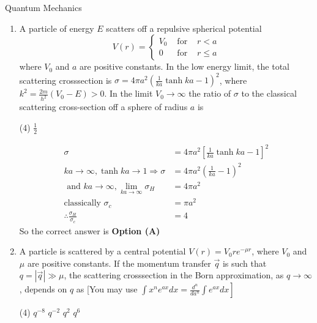 \begin{abox}
	Quantum Mechanics
	\end{abox}
\begin{enumerate}
	\item A particle of energy $E$ scatters off a repulsive spherical potential
	$$
	V(r)=\left\{\begin{array}{ccc}
	V_{0} & \text { for } & r<a \\
	0 & \text { for } & r \leq a
	\end{array}\right.
	$$
	where $V_{0}$ and $a$ are positive constants. In the low energy limit, the total scattering crosssection is $\sigma=4 \pi a^{2}\left(\frac{1}{k a} \tanh k a-1\right)^{2}$, where $k^{2}=\frac{2 m}{h^{2}}\left(V_{0}-E\right)>0$. In the limit $V_{0} \rightarrow \infty$ the ratio of $\sigma$ to the classical scattering cross-section off a sphere of radius $a$ is
{	}
\begin{tasks}(4)
\task[\textbf{D.}] $\frac{1}{2}$
\end{tasks}
\begin{answer}
\begin{align*}
\sigma&=4 \pi a^{2}\left[\frac{1}{k a} \tanh k a-1\right]^{2}\\
k a \rightarrow \infty, \tanh k a \rightarrow 1 \Rightarrow \sigma&=4 \pi a^{2}\left(\frac{1}{k a}-1\right)^{2}\\
\text{	and }k a \rightarrow \infty, \lim _{k a \rightarrow \infty} \sigma_{H}&=4 \pi a^{2}\\
\text{classically }\sigma_{c}&=\pi a^{2}\\
\therefore \frac{\sigma_{H}}{\sigma_{c}}&=4
\end{align*}
So the correct answer is \textbf{Option (A)}
\end{answer}
\item 	A particle is scattered by a central potential $V(r)=V_{0} r e^{-\mu r}$, where $V_{0}$ and $\mu$ are positive constants. If the momentum transfer $\vec{q}$ is such that $q=|\vec{q}| \gg \mu$, the scattering crosssection in the Born approximation, as $q \rightarrow \infty$, depends on $q$ as
[You may use $\left.\int x^{n} e^{a x} d x=\frac{d^{n}}{d a^{n}} \int e^{a x} d x\right]$
{{}}
\begin{tasks}(4)
\task[\textbf{A.}] $q^{-8}$
\task[\textbf{B.}] $q^{-2}$
\task[\textbf{C.}] $q^{2}$
\task[\textbf{D.}] $q^{6}$
\end{tasks}
\begin{answer}

\end{answer}
\end{enumerate}
